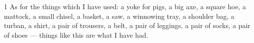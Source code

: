 
1 As for the things which I have used: a yoke for pigs, a big axe, a square hoe,
a mattock, a small chisel, a basket, a saw, a winnowing tray, a shoulder bag, a
turban, a shirt, a pair of trousers, a belt, a pair of leggings, a pair of socks,
a pair of shoes --- things like this are what I have had.


